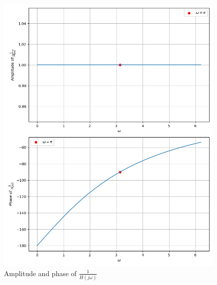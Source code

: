 \documentclass[journal,12pt,twocolumn]{IEEEtran}
\theoremstyle{remark}
\begin{document}
\begin{figure}[h]
  \centering
  \includegraphics[width=\columnwidth]{./figs/fig1.png} 
  \captionsetup{justification=centering}
  \caption{Amplitude and phase of $\frac{1}{H(j\omega)}$}
  \label{fig:in.21.f4}
\end{figure}





\end{document}
